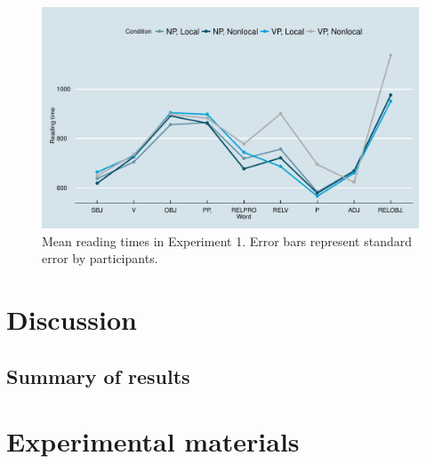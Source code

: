\documentclass[12pt]{article}
\begin{document}
\begin{figure}
\begin{center}
\includegraphics{russian-extraposed-rcs-mainplot}
\end{center}
\caption{Mean reading times in Experiment 1. Error bars represent standard error by participants.}
\label{rtfig}
\end{figure}


\section{Discussion}
\label{sec:experiment}

\subsection{Summary of results}





\appendix
\section{Experimental materials}
\end{document}
